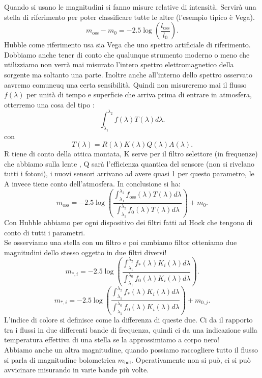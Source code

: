 Quando si usano le magnitudini si fanno misure relative di intensità. Servirà una stella di riferimento per poter classificare tutte le altre (l'esempio tipico è Vega).
\[
	m_{\text{oss}}- m_0 = -2.5 \log \left( \frac{l_{\text{oss}}}{l_0} \right) 
.\] 
Hubble come riferimento usa sia Vega che uno spettro artificiale di riferimento.\\
Dobbiamo anche tener di conto che qualunque strumento moderno o meno che utilizziamo non verrà mai misurato l'intero spettro elettromagnetico della sorgente ma soltanto una parte. Inoltre anche all'interno dello spettro osservato aavremo comuneuq una certa sensibilità.
Quindi non misureremo mai il flusso $f( \lambda ) $ per unità di tempo e superficie che arriva prima di entrare in atmosfera, otterremo una cosa del tipo :
\[
	\int_{\lambda_1}^{\lambda_2} f( \lambda ) T(\lambda) d\lambda   
.\] 
con
\[
	T( \lambda ) = R( \lambda ) K( \lambda ) Q( \lambda ) A( \lambda ) 
.\] 
R tiene di conto della ottica montata, K serve per il filtro selettore (in frequenze) che abbiamo sulla lente , Q sarà l'efficienza quantica del sensore (non si rivelano tutti i fotoni), i nuovi sensori arrivano ad avere quasi 1 per questo parametro, le 
A invece tiene conto dell'atmosfera. In conclusione si ha:
\[
	m_{\text{oss}} = - 2.5 \log \left( \frac{\int_{\lambda_1}^{\lambda_2} f_{\text{oss}}( \lambda ) T( \lambda ) d\lambda  }{\int_{\lambda_1}^{\lambda_2}   f_0( \lambda ) T( \lambda ) d\lambda } \right) + m_0
.\] 
Con Hubble abbiamo per ogni dispositivo dei filtri fatti ad Hock che tengono di conto di tutti i parametri.\\
Se osserviamo una stella con un filtro e poi cambiamo filtor otteniamo due magnitudini dello stesso oggetto in due filtri diversi!
\[
	m_{*,i}= -2.5 \log \left( \frac{\int_{\lambda_1}^{\lambda_2} f_{*}( \lambda ) K_{i}( \lambda )d\lambda   }{\int_{\lambda_1}^{\lambda_0} f_0( \lambda ) K_i ( \lambda ) d\lambda   } \right) 
.\] 
\[
	m_{*,i}= -2.5 \log \left( \frac{\int_{\lambda_1}^{\lambda_2} f_{*}( \lambda ) K_{i}( \lambda )d\lambda   }{\int_{\lambda_1}^{\lambda_0} f_0( \lambda ) K_i ( \lambda ) d\lambda   } \right) + m_{0, j}
.\] 
L'indice di colore si definisce come la differenza di queste due.
 Ci da il rapporto tra i flussi in due differenti bande di frequenza, quindi ci da una indicazione sulla temperatura effettiva di una stella se la approssimiamo a corpo nero!\\
Abbiamo anche un altra magnitudine, quando possiamo raccogliere tutto il flusso si parla di magnitudine bolometrica $m_{\text{bol}}$. Operativamente non si può, ci si può avvicinare misurando in varie bande più volte. \\
